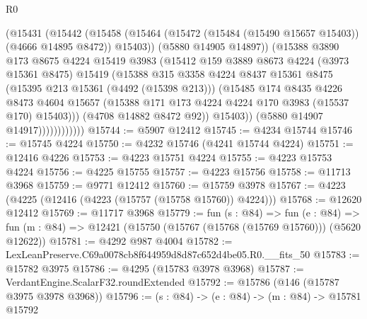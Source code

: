 \begin{lexlean}{R0}
\begin{coremodule}
                          (@15431
                            (@15442
                              (@15458
                                (@15464
                                  (@15472 (@15484 (@15490 @15657 @15403)) (@4666 @14895 @8472))
                                  @15403))
                              (@5880 @14905 @14897))
                            (@15388
                              @3890
                              @173
                              @8675
                              @4224
                              @15419
                              @3983
                              (@15412
                                @159
                                @3889
                                @8673
                                @4224
                                (@3973 @15361 @8475)
                                @15419
                                (@15388
                                  @315
                                  @3358
                                  @4224
                                  @8437
                                  @15361
                                  @8475
                                  (@15395 @213 @15361 (@4492 (@15398 @213)))
                                  (@15485
                                    @174
                                    @8435
                                    @4226
                                    @8473
                                    @4604
                                    @15657
                                    (@15388 @171 @173 @4224 @4224 @170 @3983 (@15537 @170) @15403)))
                                (@4708 @14882 @8472 @92))
                              @15403))
                          (@5880 @14907 @14917))))))))))))
@15744 := @5907 @12412
@15745 := @4234 @15744
@15746 := @15745 @4224
@15750 := @4232 @15746 (@4241 @15744 @4224)
@15751 := @12416 @4226
@15753 := @4223 @15751 @4224
@15755 := @4223 @15753 @4224
@15756 := @4225 @15755
@15757 := @4223 @15756
@15758 := @11713 @3968
@15759 := @9771 @12412
@15760 := @15759 @3978
@15767 := @4223 (@4225 (@12416 (@4223 (@15757 (@15758 @15760)) @4224)))
@15768 := @12620 @12412
@15769 := @11717 @3968
@15779 := fun (s : @84) =>
  fun (e : @84) => fun (m : @84) => @12421 (@15750 (@15767 (@15768 (@15769 @15760))) (@5620 @12622))
@15781 := @4292 @987 @4004
@15782 := LexLeanPreserve.C69a0078cb8f644959d8d87c652d4be05.R0.__fits_50
@15783 := @15782 @3975
@15786 := @4295 (@15783 @3978 @3968)
@15787 := VerdantEngine.ScalarF32.roundExtended
@15792 := @15786 (@146 (@15787 @3975 @3978 @3968))
@15796 := (s : @84) -> (e : @84) -> (m : @84) -> @15781 @15792

\end{coremodule}
\end{lexlean}
